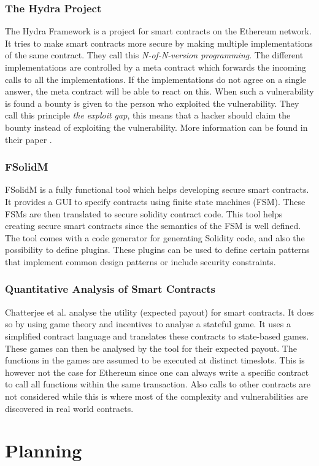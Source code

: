 \documentclass[a4paper]{article}
\begin{document}
\subsubsection{The Hydra Project}
The Hydra Framework is a project for smart contracts on the Ethereum network. It tries to make smart contracts more secure by making multiple implementations of the same contract. They call this \textit{N-of-N-version programming}. The different implementations are controlled by a meta contract which forwards the incoming calls to all the implementations. If the implementations do not agree on a single answer, the meta contract will be able to react on this. When such a vulnerability is found a bounty is given to the person who exploited the vulnerability. They call this principle \textit{the exploit gap}, this means that a hacker should claim the bounty instead of exploiting the vulnerability. More information can be found in their paper \cite{breidenbachenter}. 

\subsubsection{FSolidM}
FSolidM \cite{mavridou2018tool} is a fully functional tool which helps developing secure smart contracts. It provides a GUI to specify contracts using finite state machines (FSM). These FSMs are then translated to secure solidity contract code. This tool helps creating secure smart contracts since the semantics of the FSM is well defined. The tool comes with a code generator for generating Solidity code, and also the possibility to define plugins. These plugins can be used to define certain patterns that implement common design patterns or include security constraints. 
\subsubsection{Quantitative Analysis of Smart Contracts}
Chatterjee et al. \cite{chatterjee2018quantitative} analyse the utility (expected payout) for smart contracts. It does so by using game theory and incentives to analyse a stateful game. It uses a simplified contract language and translates these contracts to state-based games. These games can then be analysed by the tool for their expected payout. The functions in the games are assumed to be executed at distinct timeslots. This is however not the case for Ethereum since one can always write a specific contract to call all functions within the same transaction. Also calls to other contracts are not considered while this is where most of the complexity and vulnerabilities are discovered in real world contracts.







\section{Planning}





\end{document}
